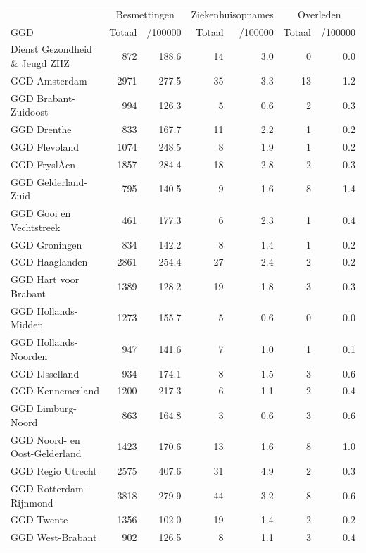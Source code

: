 \documentclass[
  english,
  man,floatsintext]{apa6}
\begin{document}
\begin{table}
\centering\begingroup\fontsize{10}{12}\selectfont

\begin{threeparttable}
\begin{tabular}{lrrrrrr}
\toprule
\multicolumn{1}{c}{ } & \multicolumn{2}{c}{Besmettingen} & \multicolumn{2}{c}{Ziekenhuisopnames} & \multicolumn{2}{c}{Overleden} \\
\cmidrule(l{3pt}r{3pt}){2-3} \cmidrule(l{3pt}r{3pt}){4-5} \cmidrule(l{3pt}r{3pt}){6-7}
GGD & Totaal & /100000 & Totaal & /100000 & Totaal & /100000\\
\midrule
Dienst Gezondheid \& Jeugd ZHZ & 872 & 188.6 & 14 & 3.0 & 0 & 0.0\\
GGD Amsterdam & 2971 & 277.5 & 35 & 3.3 & 13 & 1.2\\
GGD Brabant-Zuidoost & 994 & 126.3 & 5 & 0.6 & 2 & 0.3\\
GGD Drenthe & 833 & 167.7 & 11 & 2.2 & 1 & 0.2\\
GGD Flevoland & 1074 & 248.5 & 8 & 1.9 & 1 & 0.2\\
GGD FryslÃ¢n & 1857 & 284.4 & 18 & 2.8 & 2 & 0.3\\
GGD Gelderland-Zuid & 795 & 140.5 & 9 & 1.6 & 8 & 1.4\\
GGD Gooi en Vechtstreek & 461 & 177.3 & 6 & 2.3 & 1 & 0.4\\
GGD Groningen & 834 & 142.2 & 8 & 1.4 & 1 & 0.2\\
GGD Haaglanden & 2861 & 254.4 & 27 & 2.4 & 2 & 0.2\\
GGD Hart voor Brabant & 1389 & 128.2 & 19 & 1.8 & 3 & 0.3\\
GGD Hollands-Midden & 1273 & 155.7 & 5 & 0.6 & 0 & 0.0\\
GGD Hollands-Noorden & 947 & 141.6 & 7 & 1.0 & 1 & 0.1\\
GGD IJsselland & 934 & 174.1 & 8 & 1.5 & 3 & 0.6\\
GGD Kennemerland & 1200 & 217.3 & 6 & 1.1 & 2 & 0.4\\
GGD Limburg-Noord & 863 & 164.8 & 3 & 0.6 & 3 & 0.6\\
GGD Noord- en Oost-Gelderland & 1423 & 170.6 & 13 & 1.6 & 8 & 1.0\\
GGD Regio Utrecht & 2575 & 407.6 & 31 & 4.9 & 2 & 0.3\\
GGD Rotterdam-Rijnmond & 3818 & 279.9 & 44 & 3.2 & 8 & 0.6\\
GGD Twente & 1356 & 102.0 & 19 & 1.4 & 2 & 0.2\\
GGD West-Brabant & 902 & 126.5 & 8 & 1.1 & 3 & 0.4\\

\end{tabular}
\end{threeparttable}
\end{table}
\end{document}
